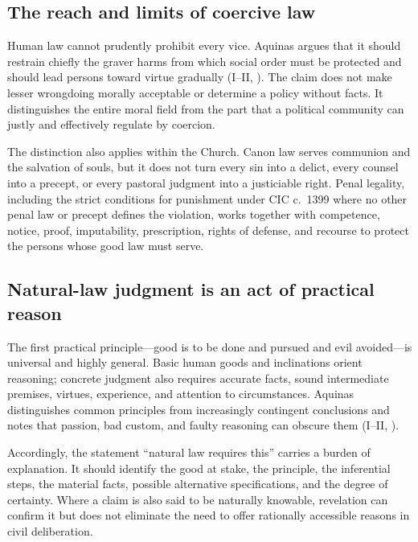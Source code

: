 \subsection{The reach and limits of coercive law}

Human law cannot prudently prohibit every vice. Aquinas argues that it should restrain chiefly the graver harms from which social order must be protected and should lead persons toward virtue gradually (I--II, ). The claim does not make lesser wrongdoing morally acceptable or determine a policy without facts. It distinguishes the entire moral field from the part that a political community can justly and effectively regulate by coercion.

The distinction also applies within the Church. Canon law serves communion and the salvation of souls, but it does not turn every sin into a delict, every counsel into a precept, or every pastoral judgment into a justiciable right. Penal legality, including the strict conditions for punishment under CIC c.~1399 where no other penal law or precept defines the violation, works together with competence, notice, proof, imputability, prescription, rights of defense, and recourse to protect the persons whose good law must serve.

\subsection{Natural-law judgment is an act of practical reason}

The first practical principle---good is to be done and pursued and evil avoided---is universal and highly general. Basic human goods and inclinations orient reasoning; concrete judgment also requires accurate facts, sound intermediate premises, virtues, experience, and attention to circumstances. Aquinas distinguishes common principles from increasingly contingent conclusions and notes that passion, bad custom, and faulty reasoning can obscure them (I--II, ).

Accordingly, the statement ``natural law requires this'' carries a burden of explanation. It should identify the good at stake, the principle, the inferential steps, the material facts, possible alternative specifications, and the degree of certainty. Where a claim is also said to be naturally knowable, revelation can confirm it but does not eliminate the need to offer rationally accessible reasons in civil deliberation.

